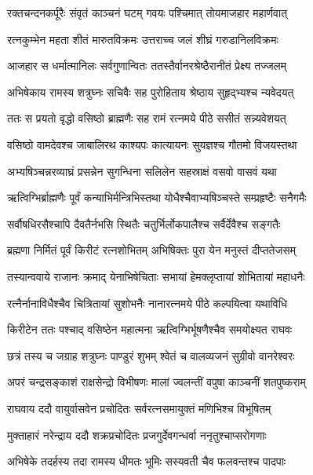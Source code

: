 \twolineshloka
{रक्तचन्दनकर्पूरैः संवृतं काञ्चनं घटम्}
{गवयः पश्चिमात् तोयमाजहार महार्णवात्} %

\twolineshloka
{रत्नकुम्भेन महता शीतं मारुतविक्रमः}
{उत्तराच्च जलं शीघ्रं गरुडानिलविक्रमः} %

\twolineshloka
{आजहार स धर्मात्मानिलः सर्वगुणान्वितः}
{ततस्तैर्वानरश्रेष्ठैरानीतं प्रेक्ष्य तज्जलम्} %

\twolineshloka
{अभिषेकाय रामस्य शत्रुघ्नः सचिवैः सह}
{पुरोहिताय श्रेष्ठाय सुहृद्भ्यश्च न्यवेदयत्} %

\twolineshloka
{ततः स प्रयतो वृद्धो वसिष्ठो ब्राह्मणैः सह}
{रामं रत्नमये पीठे ससीतं सन्न्यवेशयत्} %

\twolineshloka
{वसिष्ठो वामदेवश्च जाबालिरथ काश्यपः}
{कात्यायनः सुयज्ञश्च गौतमो विजयस्तथा} %

\twolineshloka
{अभ्यषिञ्चन्नरव्याघ्रं प्रसन्नेन सुगन्धिना}
{सलिलेन सहस्राक्षं वसवो वासवं यथा} %

\twolineshloka
{ऋत्विग्भिर्ब्राह्मणैः पूर्वं कन्याभिर्मन्त्रिभिस्तथा}
{योधैश्चैवाभ्यषिञ्चस्ते सम्प्रहृष्टैः सनैगमैः} %

\twolineshloka
{सर्वौषधिरसैश्चापि दैवतैर्नभसि स्थितैः}
{चतुर्भिर्लोकपालैश्च सर्वैर्देवैश्च सङ्गतैः} %

\twolineshloka
{ब्रह्मणा निर्मितं पूर्वं किरीटं रत्नशोभितम्}
{अभिषिक्तः पुरा येन मनुस्तं दीप्ततेजसम्} %

\twolineshloka
{तस्यान्ववाये राजानः क्रमाद् येनाभिषेचिताः}
{सभायां हेमक्लृप्तायां शोभितायां महाधनैः} %

\twolineshloka
{रत्नैर्नानाविधैश्चैव चित्रितायां सुशोभनैः}
{नानारत्नमये पीठे कल्पयित्वा यथाविधि} %

\twolineshloka
{किरीटेन ततः पश्चाद् वसिष्ठेन महात्मना}
{ऋत्विग्भिर्भूषणैश्चैव समयोक्ष्यत राघवः} %

\twolineshloka
{छत्रं तस्य च जग्राह शत्रुघ्नः पाण्डुरं शुभम्}
{श्वेतं च वालव्यजनं सुग्रीवो वानरेश्वरः} %

\twolineshloka
{अपरं चन्द्रसङ्काशं राक्षसेन्द्रो विभीषणः}
{मालां ज्वलन्तीं वपुषा काञ्चनीं शतपुष्कराम्} %

\twolineshloka
{राघवाय ददौ वायुर्वासवेन प्रचोदितः}
{सर्वरत्नसमायुक्तं मणिभिश्च विभूषितम्} %

\twolineshloka
{मुक्ताहारं नरेन्द्राय ददौ शक्रप्रचोदितः}
{प्रजगुर्देवगन्धर्वा ननृतुश्चाप्सरोगणाः} %

\twolineshloka
{अभिषेके तदर्हस्य तदा रामस्य धीमतः}
{भूमिः सस्यवती चैव फलवन्तश्च पादपाः} %

